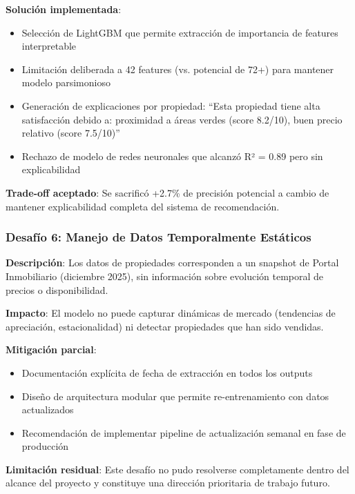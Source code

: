 \textbf{Solución implementada}:
\begin{itemize}
    \item Selección de LightGBM que permite extracción de importancia de features interpretable
    \item Limitación deliberada a 42 features (vs. potencial de 72+) para mantener modelo parsimonioso
    \item Generación de explicaciones por propiedad: ``Esta propiedad tiene alta satisfacción debido a: proximidad a áreas verdes (score 8.2/10), buen precio relativo (score 7.5/10)''
    \item Rechazo de modelo de redes neuronales que alcanzó R² = 0.89 pero sin explicabilidad
\end{itemize}

\textbf{Trade-off aceptado}: Se sacrificó +2.7\% de precisión potencial a cambio de mantener explicabilidad completa del sistema de recomendación.

\subsubsection{Desafío 6: Manejo de Datos Temporalmente Estáticos}

\textbf{Descripción}: Los datos de propiedades corresponden a un snapshot de Portal Inmobiliario (diciembre 2025), sin información sobre evolución temporal de precios o disponibilidad.

\textbf{Impacto}: El modelo no puede capturar dinámicas de mercado (tendencias de apreciación, estacionalidad) ni detectar propiedades que han sido vendidas.

\textbf{Mitigación parcial}:
\begin{itemize}
    \item Documentación explícita de fecha de extracción en todos los outputs
    \item Diseño de arquitectura modular que permite re-entrenamiento con datos actualizados
    \item Recomendación de implementar pipeline de actualización semanal en fase de producción
\end{itemize}

\textbf{Limitación residual}: Este desafío no pudo resolverse completamente dentro del alcance del proyecto y constituye una dirección prioritaria de trabajo futuro.


